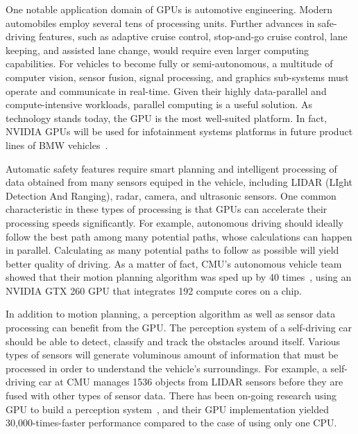 \documentclass[times, 10pt, twocolumn]{article}
\begin{document}
One notable application domain of GPUs is automotive engineering.
Modern automobiles employ several tens of processing units.
Further advances in safe-driving features, such as adaptive
cruise control, stop-and-go cruise control, lane keeping, and assisted
lane change, would require even larger computing capabilities.
For vehicles to become fully or semi-autonomous, 
a multitude of computer vision,
sensor fusion, signal processing, and graphics sub-systems must operate and
communicate in real-time.
Given their highly data-parallel and compute-intensive workloads, 
parallel computing is a useful solution.
As technology stands today, the GPU is the most well-suited platform.
In fact, NVIDIA GPUs will be used for infotainment systems platforms in
future product lines of BMW vehicles~\cite{NVIDIA_BMW}.

Automatic safety features require smart planning and intelligent
processing of data obtained from many sensors equiped in the vehicle,
including LIDAR (LIght Detection And Ranging), radar, camera, and
ultrasonic sensors. 
One common characteristic in these types of processing is that GPUs can
accelerate their processing speeds significantly.
For example, autonomous driving should ideally follow the best path among
many potential paths, whose calculations can happen in parallel.
Calculating as many potential paths to follow as possible
will yield better quality of driving.
As a matter of fact, CMU's autonomous vehicle team showed that their
motion planning algorithm was sped up by 40 times~\cite{McNaughton11},
using an NVIDIA GTX 260 GPU that integrates 192 compute cores on a
chip.

In addition to motion planning, a perception algorithm as well as 
sensor data processing can benefit from the GPU.
The perception system of a self-driving car should
be able to detect, classify and track the obstacles around
itself. Various types of sensors will generate voluminous amount of
information that must be processed in order to understand the vehicle's surroundings. 
For example, a self-driving car at CMU manages 1536 objects from LIDAR
sensors before they are fused with other types of sensor data. There has
been on-going research using GPU to build a perception
system~\cite{Ferreira11}, and their GPU implementation yielded
30,000-times-faster performance compared to the case of using only one CPU. 
\end{document}
